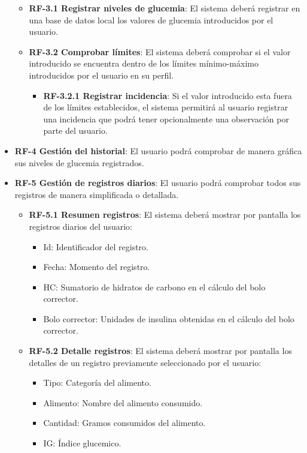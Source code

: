 \begin{itemize}
		\begin{itemize}
			\item \textbf{RF-3.1 Registrar niveles de glucemia}: El sistema deberá registrar en una base de datos local los valores de glucemia introducidos por el usuario.
			\item \textbf{RF-3.2 Comprobar límites}: El sistema deberá comprobar si el valor introducido se encuentra dentro de los límites mínimo-máximo introducidos por el usuario en su perfil.
				\begin{itemize}
					\item \textbf{RF-3.2.1 Registrar incidencia}: Si el valor introducido esta fuera de los límites establecidos, el sistema permitirá al usuario registrar una incidencia que podrá tener opcionalmente una observación por parte del usuario.
				\end{itemize}
		\end{itemize}
	\item \textbf{RF-4 Gestión del historial}: El usuario podrá comprobar de manera gráfica sus niveles de glucemia registrados.
	\item \textbf{RF-5 Gestión de registros diarios}: El usuario podrá comprobar todos sus registros de manera simplificada o detallada.
		\begin{itemize}
			\item \textbf{RF-5.1 Resumen registros}: El sistema deberá mostrar por pantalla los registros diarios del usuario:
				\begin{itemize}
					\item Id: Identificador del registro.
					\item Fecha:  Momento del registro.
					\item HC: Sumatorio de hidratos de carbono en el cálculo del bolo corrector.
					\item Bolo corrector: Unidades de insulina obtenidas en el cálculo del bolo corrector.
				\end{itemize}
			\item \textbf{RF-5.2 Detalle registros}: El sistema deberá mostrar por pantalla los detalles de un registro previamente seleccionado por el usuario:
			\begin{itemize}
					\item Tipo: Categoría del alimento.
					\item Alimento: Nombre del alimento consumido.
					\item Cantidad: Gramos consumidos del alimento.
					\item IG: Índice glucemico.

\end{itemize}
\end{itemize}
\end{itemize}
